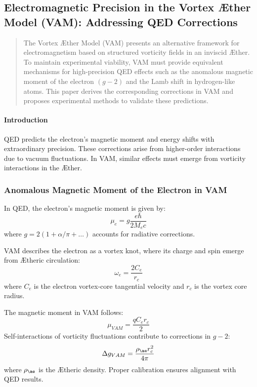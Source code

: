 

\subsection{Electromagnetic Precision in the Vortex \AE ther Model (VAM): Addressing QED Corrections}\label{subsec:electromagnetic-precision-in-the-vortex-ae-ther-model-(vam):-addressing-qed-corrections}


\begin{abstract}
    The Vortex \AE ther Model (VAM) presents an alternative framework for electromagnetism based on structured vorticity fields in an inviscid \AE ther. To maintain experimental viability, VAM must provide equivalent mechanisms for high-precision QED effects such as the anomalous magnetic moment of the electron $(g-2)$ and the Lamb shift in hydrogen-like atoms. This paper derives the corresponding corrections in VAM and proposes experimental methods to validate these predictions.
\end{abstract}

\paragraph*{Introduction}
QED predicts the electron's magnetic moment and energy shifts with extraordinary precision. These corrections arise from higher-order interactions due to vacuum fluctuations. In VAM, similar effects must emerge from vorticity interactions in the \AE ther.

\subsubsection*{Anomalous Magnetic Moment of the Electron in VAM}
In QED, the electron's magnetic moment is given by:
\begin{equation}
    \mu_e = g \frac{e\hbar}{2M_e c}
\end{equation}
where $g = 2(1 + \alpha / \pi + \dots)$ accounts for radiative corrections.

VAM describes the electron as a vortex knot, where its charge and spin emerge from \AE theric circulation:
\begin{equation}
    \omega_e = \frac{2 C_e}{r_c}
\end{equation}
where $C_e$ is the electron vortex-core tangential velocity and $r_c$ is the vortex core radius.

The magnetic moment in VAM follows:
\begin{equation}
    \mu_{VAM} = \frac{q C_e r_c}{2}
\end{equation}
Self-interactions of vorticity fluctuations contribute to corrections in $g-2$:
\begin{equation}
    \Delta g_{VAM} = \frac{\rho_{\ae} r_c^2}{4\pi}
\end{equation}
where $\rho_{\ae}$ is the \AE theric density. Proper calibration ensures alignment with QED results.

